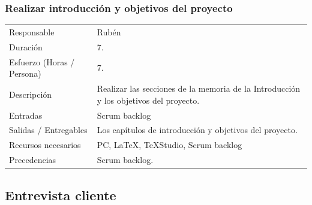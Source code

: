 \subsubsection{Realizar introducci\'{o}n y objetivos del proyecto}
\begin{table}[H]
    \begin{center}
        \begin{tabular}{l p{8cm}}
            Responsable                           & Rub\'{e}n \\
            Duraci\'{o}n                          & 7. \\ 
            Esfuerzo (Horas / Persona)            & 7. \\
            Descripci\'{o}n                       & Realizar las secciones de la memoria de la Introducci\'{o}n y los
                                                    objetivos del proyecto. \\
            Entradas                              & Scrum backlog  \\
            Salidas / Entregables                 & Los cap\'{i}tulos de introducci\'{o}n y objetivos del proyecto. \\
            Recursos necesarios                   & PC, \LaTeX, TeXStudio, Scrum backlog \\
            Precedencias                          & Scrum backlog. \\
        \end{tabular}
    \end{center}
    
\end{table}

\subsection{Entrevista cliente}
